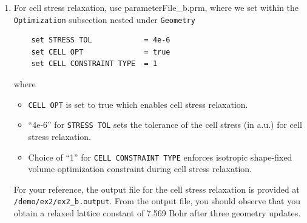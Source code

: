 \begin{enumerate}
\item For cell stress relaxation, use parameterFile\_b.prm, where we set within the \verb|Optimization| subsection nested under \verb|Geometry|
\begin{verbatim}
    set STRESS TOL            = 4e-6
    set CELL OPT              = true
    set CELL CONSTRAINT TYPE  = 1
\end{verbatim}
where
\begin{itemize}
\item \verb|CELL OPT| is set to true which enables cell stress relaxation.  		
\item ``4e-6'' for \verb|STRESS TOL| sets the tolerance of the cell stress (in a.u.) for cell stress relaxation.
\item Choice of ``1'' for \verb|CELL CONSTRAINT TYPE| enforces isotropic shape-fixed volume optimization constraint during cell stress relaxation.
\end{itemize}
For your reference, the output file for the cell stress relaxation is provided at \verb|/demo/ex2/ex2_b.output|. From the output file, you should observe that you obtain a relaxed lattice constant of 7.569 Bohr after three geometry updates. 
\end{enumerate}

